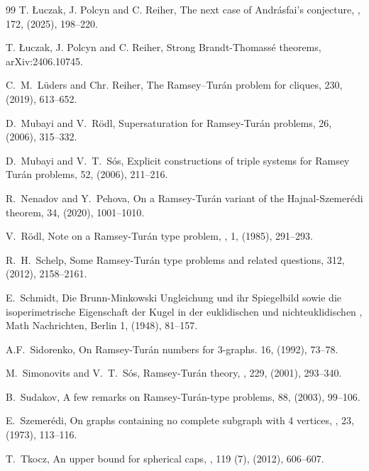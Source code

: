 \documentclass[11pt, a4paper]{article}
\theoremstyle{definition}
\begin{document}
\begin{thebibliography}{99}
T. \L uczak, J. Polcyn and C. Reiher,
\newblock The next case of Andr\'asfai's conjecture, 
, 172, (2025), 198--220.

T. \L uczak, J. Polcyn and C. Reiher,
\newblock Strong Brandt-Thomass\'e theorems, 
\newblock arXiv:2406.10745.

C.~M.~L\"uders and Chr. Reiher,
\newblock The Ramsey–Tur\'an problem for cliques,
 230, (2019), 613--652.

D.~Mubayi and V.~R\"odl,
\newblock Supersaturation for Ramsey-Tur\'an problems,
 26, (2006), 315--332.

D.~Mubayi and V.~T.~S\'os,
\newblock Explicit constructions of triple systems for Ramsey Tur\'an problems,
 52, (2006), 211--216.

R.~Nenadov and Y.~Pehova,
\newblock On a Ramsey-Tur\'an variant of the Hajnal-Szemer\'edi theorem,
 34, (2020), 1001--1010.

V.~R\"odl,
\newblock Note on a Ramsey-Tur\'an type problem,
, 1, (1985), 291--293.

R.~H.~Schelp,
\newblock Some Ramsey-Tur\'an type problems and related questions,
 312, (2012), 2158--2161.

E.~Schmidt, 
\newblock Die Brunn-Minkowski Ungleichung und ihr Spiegelbild sowie die isoperimetrische Eigenschaft der Kugel in der euklidischen und nichteuklidischen
, Math Nachrichten, Berlin 1, (1948), 81--157.

A.F.~Sidorenko,
\newblock On Ramsey-Tur\'an numbers for $3$-graphs.
 16, (1992), 73--78.

M.~Simonovits and V.~T.~S\'os,
\newblock Ramsey-Tur\'an theory,
, 229, (2001), 293--340.

B.~Sudakov, 
\newblock A few remarks on Ramsey-Tur\'an-type problems, 
 88, (2003), 99--106.

E.~Szemer\'edi,
\newblock On graphs containing no complete subgraph with 4 vertices,
, 23, (1973), 113--116.

T.~Tkocz,
\newblock An upper bound for spherical caps,
, 119 (7), (2012), 606--607.

\end{thebibliography}
\end{document}
